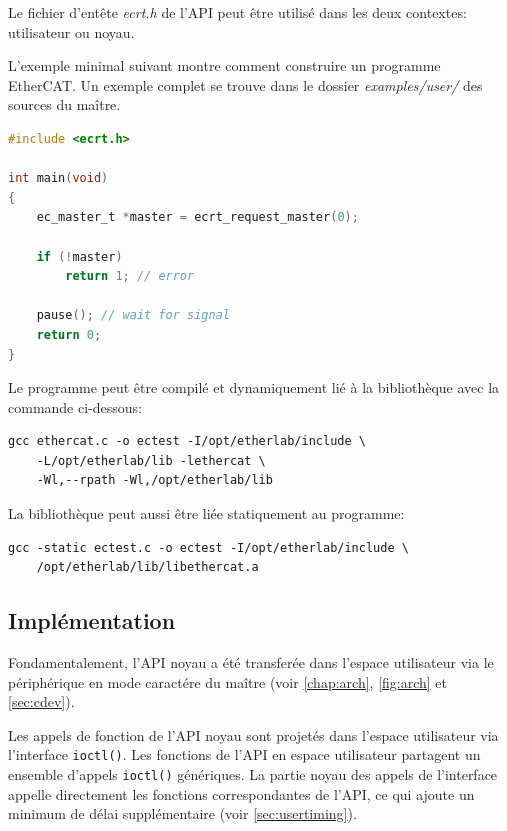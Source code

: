 \documentclass[a4paper,12pt,BCOR6mm,bibtotoc,idxtotoc]{scrbook}
\begin{document}
Le fichier d'ent\^ete \textit{ecrt.h} de l'API peut \^etre utilis\'e
dans les deux contextes: utilisateur ou noyau.

L'exemple minimal suivant montre comment construire un programme
EtherCAT. Un exemple complet se trouve dans le dossier \textit{examples/user/}
des sources du ma\^itre.

\begin{lstlisting}[language=C]
#include <ecrt.h>

int main(void)
{
    ec_master_t *master = ecrt_request_master(0);

    if (!master)
        return 1; // error

    pause(); // wait for signal
    return 0;
}
\end{lstlisting}

Le programme peut \^etre compil\'e et dynamiquement li\'e \`a la
biblioth\`eque avec la commande ci-dessous:

\begin{lstlisting}[caption=Commande de l'\'editeur de liens pour utiliser la biblioth\`eque
    de l'espace utilisateur,
label=lst:linker-user]
gcc ethercat.c -o ectest -I/opt/etherlab/include \
    -L/opt/etherlab/lib -lethercat \
    -Wl,--rpath -Wl,/opt/etherlab/lib
\end{lstlisting}

La biblioth\`eque peut aussi \^etre li\'ee statiquement au programme:

\begin{lstlisting}
gcc -static ectest.c -o ectest -I/opt/etherlab/include \
    /opt/etherlab/lib/libethercat.a
\end{lstlisting}

\subsection{Impl\'ementation}
\label{sec:userimp}

Fondamentalement, l'API noyau a \'et\'e transfer\'ee dans l'espace
utilisateur via le p\'eriph\'erique en mode caract\'ere du ma\^itre
(voir \autoref{chap:arch}, \autoref{fig:arch} et \autoref{sec:cdev}).

Les appels de fonction de l'API noyau sont projet\'es dans l'espace
utilisateur via l'interface \lstinline+ioctl()+. Les fonctions de
l'API en espace utilisateur partagent un ensemble d'appels
\lstinline+ioctl()+ g\'en\'eriques.  La partie noyau des appels de
l'interface appelle directement les fonctions correspondantes de
l'API, ce qui ajoute un minimum de d\'elai suppl\'ementaire (voir
\autoref{sec:usertiming}).
\end{document}
